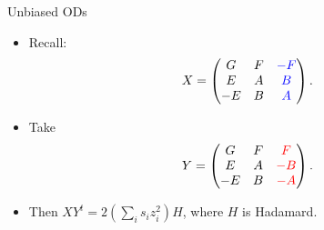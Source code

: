 \documentclass{beamer}
\newcommand{\rred}[1]{\textcolor{red}{#1}}
\newcommand{\bblue}[1]{\textcolor{blue}{#1}}
\begin{document}
\begin{frame}{Unbiased ODs}

  \begin{itemize}
    \item Recall:
      \[
        X = \begin{pmatrix}
              G & F & \bblue{-F} \\
              E & A & \bblue{B} \\
              -E & B & \bblue{A}
            \end{pmatrix}.
      \]
    \item Take
      \[
        Y = \begin{pmatrix}
              G & F & \rred{F} \\
              E & A & \rred{-B} \\
              -E & B & \rred{-A}
            \end{pmatrix}.
      \]
    \item Then $XY^t = 2\left( \sum_is_iz_i^2 \right)H$, where $H$ is Hadamard.
  \end{itemize}
  
\end{frame}
\end{document}
